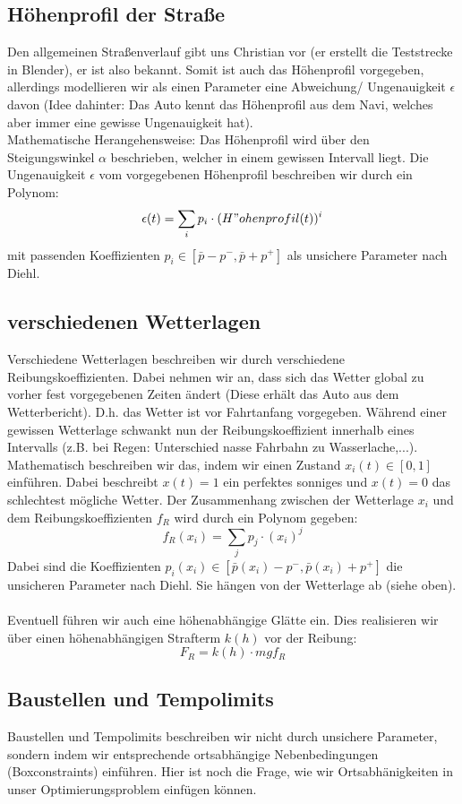 \documentclass[12pt,a4paper]{article}
\theoremstyle{definition}
\theoremstyle{plain}
\begin{document}
\subsection{Höhenprofil der Straße}
Den allgemeinen Straßenverlauf gibt uns Christian vor (er erstellt die Teststrecke in Blender), er ist also bekannt. Somit ist auch das Höhenprofil vorgegeben, allerdings modellieren wir als einen Parameter eine Abweichung/ Ungenauigkeit $\epsilon$ davon (Idee dahinter: Das Auto kennt das Höhenprofil aus dem Navi, welches aber immer eine gewisse Ungenauigkeit hat).\\
Mathematische Herangehensweise: Das Höhenprofil wird über den Steigungswinkel $\alpha$ beschrieben, welcher in einem gewissen Intervall liegt. Die Ungenauigkeit $\epsilon$ vom vorgegebenen Höhenprofil beschreiben wir durch ein Polynom:
$$ \epsilon(t)=\sum_{i} p_{i}\cdot(H"ohenprofil(t))^{i}$$
mit passenden Koeffizienten $p_{i}\in [\bar{p}-p^{-}, \bar{p}+p^{+}]$ als unsichere Parameter nach Diehl.

\subsection{verschiedenen Wetterlagen}
Verschiedene Wetterlagen beschreiben wir durch verschiedene Reibungskoeffizienten. Dabei nehmen wir an, dass sich das Wetter global zu vorher fest vorgegebenen Zeiten ändert (Diese erhält das Auto aus dem Wetterbericht). D.h. das Wetter ist vor Fahrtanfang vorgegeben. Während einer gewissen Wetterlage schwankt nun der Reibungskoeffizient innerhalb eines Intervalls (z.B. bei Regen: Unterschied nasse Fahrbahn zu Wasserlache,...).\\
Mathematisch beschreiben wir das, indem wir einen Zustand $x_{i}(t)\in [0,1]$ einführen. Dabei beschreibt $x(t)=1$ ein perfektes sonniges und $x(t)=0$ das schlechtest mögliche Wetter. Der Zusammenhang zwischen der Wetterlage $x_{i}$ und dem Reibungskoeffizienten $f_{R}$ wird durch ein Polynom gegeben:
$$f_{R}(x_{i})=\sum_{j} p_{j}\cdot (x_{i})^{j} $$
Dabei sind die Koeffizienten $p_{i}(x_{i})\in [\bar{p}(x_{i})-p^{-},\bar{p}(x_{i})+p^{+}]$ die unsicheren Parameter nach Diehl. Sie hängen von der Wetterlage ab (siehe oben).\\
\\
Eventuell führen wir auch eine höhenabhängige Glätte ein. Dies realisieren wir über einen höhenabhängigen Strafterm $k(h)$ vor der Reibung:
$$ F_{R}= k(h)\cdot mgf_{R}$$

\subsection{Baustellen und Tempolimits}
Baustellen und Tempolimits beschreiben wir nicht durch unsichere Parameter, sondern indem wir entsprechende ortsabhängige Nebenbedingungen (Boxconstraints) einführen. Hier ist noch die Frage, wie wir Ortsabhänigkeiten in unser Optimierungsproblem einfügen können.
\end{document}
